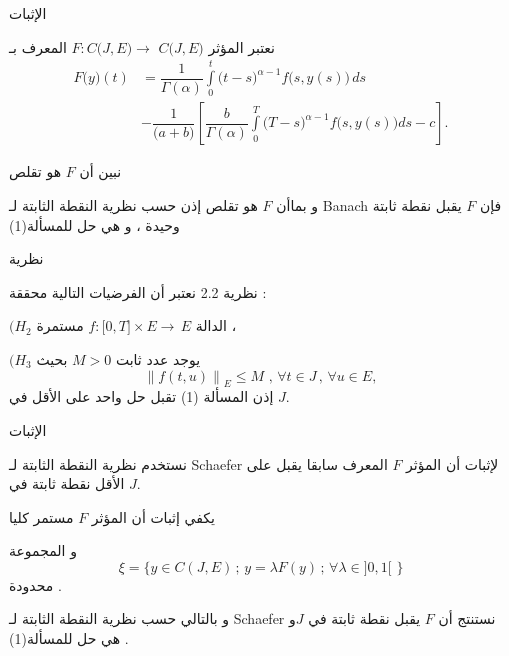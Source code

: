 \documentclass[dvipsnames,mathserif]{beamer}
\begin{document}
\begin{frame}{الإثبات}
\begin{tcolorbox}[enhanced,arc=3mm,boxrule=1.5mm,boxsep=1.5mm,
colback=yellow!20!white,
colframe=blue,
borderline={1mm}{1mm}{yellow},
borderline={1mm}{2mm}{green} ]
نعتبر المؤثر 
$F:C\big(J,E\big) \to \,\,C\big(J,E\big)$
المعرف بـ 
\begin{align*}
F\big(y\big)(t) &= \dfrac{1}{{\Gamma (\alpha )}}\int\limits_0^t {\big(t - s\big)^{\alpha -1}} f\big(s,y(s)\big)\,ds \\
&- \dfrac{1}{{\big(a + b\big)}}\left[\dfrac{b}{{\Gamma (\alpha )}}\int\limits_0^T {\big(T - s\big)}^{\alpha  - 1}f\big(s,y(s)\big)ds - c\right].
\end{align*}

نبين أن $F$ هو تقلص 

و بماأن $F$ هو تقلص إذن حسب نظرية النقطة الثابتة لـ Banach 
فإن
 $F$
 يقبل نقطة ثابتة وحيدة ، و هي حل للمسألة(1)  
\end{tcolorbox}
\end{frame}
\begin{frame}{نظرية}
\begin{mybox}[colbacktitle = green]{نظرية 2.2}
{\LARGE{}}
نعتبر أن الفرضيات التالية محققة :

$\big(H_{2}$
الدالة 
$f:\big[0,T\big]\times E\to \,E$ 
مستمرة ،

$\big(H_{3}$
يوجد عدد ثابت 
$ M>0 $
بحيث 
$${{\big\| f(t,u) \big\|}_{E}}\le M\,\,,\,\forall t\in J\,,\,\forall u\in E,$$ 
إذن المسألة (1)
تقبل حل واحد على الأقل في $J$.
\end{mybox}
\end{frame}
\begin{frame}{الإثبات}
\begin{tcolorbox}[enhanced,arc=3mm,boxrule=1.5mm,boxsep=1.5mm,
colback=yellow!20!white,
colframe=blue,
borderline={1mm}{1mm}{yellow},
borderline={1mm}{2mm}{green} ]
نستخدم نظرية النقطة الثابتة لـ 
Schaefer
لإثبات أن المؤثر $F$ المعرف سابقا  يقبل  على الأقل نقطة ثابتة في $J$.

يكفي إثبات
أن المؤثر 
$F$
مستمر كليا

و المجموعة 
$$\xi  = \bigg\{y \in C(J,E)\,;\,y = \lambda F(y)\,;\,\forall \lambda  \in \big]0,1\big[\,\, \bigg\}$$
محدودة .

و بالتالي حسب نظرية النقطة الثابتة لـ
Schaefer
نستنتج أن 
$F$
يقبل نقطة ثابتة في $J$و هي حل للمسألة(1) 
.
\end{tcolorbox}
\end{frame}
\end{document}
